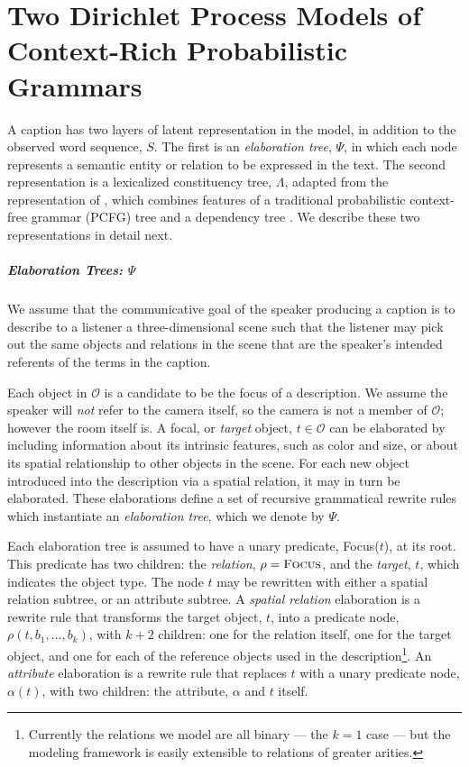 \documentclass[12pt,letterpaper]{report}
\begin{document}
\chapter{Two Dirichlet Process Models of Context-Rich Probabilistic Grammars}

A caption has two layers of latent 
representation in the model, in addition to the observed word
sequence, $S$.  The first is an
{\em elaboration tree}, $\Psi$, in which each node represents a semantic
entity or relation to be expressed in the text.  The second
representation is a lexicalized constituency tree, $\Lambda$, adapted from the
representation of \citet{collins2003head}, which combines features of
a traditional probabilistic context-free grammar (PCFG) tree and a dependency tree
\cite{mcdm08b}.  We describe these two representations in detail next.

\paragraph{Elaboration Trees: $\Psi$}

We assume that the communicative goal of the speaker producing a
caption is to describe to a listener a three-dimensional scene such
that the listener may pick out the same objects and relations in the
scene that are the speaker's intended referents of the terms in the
caption.  

Each object in $\mathcal{O}$ is a candidate to be the focus of a
description.  We assume the speaker will {\em not} refer to the camera
itself, so the camera is not a member of $\mathcal{O}$; however the
room itself is.  A focal, or
{\em target} object, $t \in \mathcal{O}$ can be elaborated by
including information about its intrinsic features, 
such as color and size, or about its spatial relationship to 
other objects in the scene.  For each new object introduced into 
the description via a spatial relation, it may in turn be elaborated.
These elaborations define a set of recursive grammatical rewrite rules
which instantiate an {\em elaboration tree}, which we denote by $\Psi$.

Each elaboration tree is assumed to have a unary predicate, {\sc
  Focus}($t$), at its root.  This predicate has two children: the {\em
  relation}, $\rho = \textsc{Focus}$, and the {\em target},
$t$, which
indicates the object type.  The node $t$ may be rewritten with either
a spatial relation subtree, or an attribute subtree.  A {\em spatial
  relation} elaboration is a rewrite rule that 
transforms the target object, $t$, into a
predicate node, $\rho(t, b_1, \dots, b_k)$, with $k+2$ children: one
for the relation itself, one for the target object, and one for each
of the reference objects used in the description\footnote{Currently
  the relations we model are all binary --- the $k = 1$ case --- 
but the modeling framework is easily extensible to 
relations of greater arities.}.  An {\em attribute} elaboration is a
rewrite rule that replaces $t$ with a unary predicate node,
$\alpha(t)$, with two children: the attribute, $\alpha$ and $t$ itself.
\end{document}
